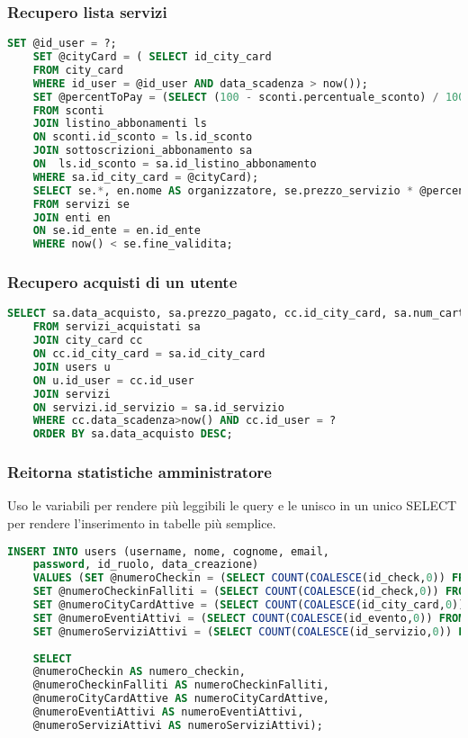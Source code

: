 \subsubsection{Recupero lista servizi}
\begin{lstlisting}[language=SQL]
	SET @id_user = ?;     
	SET @cityCard = ( SELECT id_city_card
	FROM city_card
	WHERE id_user = @id_user AND data_scadenza > now());
	SET @percentToPay = (SELECT (100 - sconti.percentuale_sconto) / 100
	FROM sconti 
	JOIN listino_abbonamenti ls 
	ON sconti.id_sconto = ls.id_sconto
	JOIN sottoscrizioni_abbonamento sa
	ON  ls.id_sconto = sa.id_listino_abbonamento
	WHERE sa.id_city_card = @cityCard);
	SELECT se.*, en.nome AS organizzatore, se.prezzo_servizio * @percentToPay AS prezzo_scontato
	FROM servizi se
	JOIN enti en
	ON se.id_ente = en.id_ente
	WHERE now() < se.fine_validita;
\end{lstlisting}

\subsubsection{Recupero acquisti di un utente}
\begin{lstlisting}[language=SQL]
	SELECT sa.data_acquisto, sa.prezzo_pagato, cc.id_city_card, sa.num_carta_credito, servizi.descrizione_servizio AS nome_servizio, u.id_user, sa.id_servizio
	FROM servizi_acquistati sa
	JOIN city_card cc
	ON cc.id_city_card = sa.id_city_card
	JOIN users u
	ON u.id_user = cc.id_user
	JOIN servizi
	ON servizi.id_servizio = sa.id_servizio
	WHERE cc.data_scadenza>now() AND cc.id_user = ?
	ORDER BY sa.data_acquisto DESC;
\end{lstlisting}



\subsubsection{Reitorna statistiche amministratore}
Uso le variabili per rendere più leggibili le query e le unisco in un unico SELECT per rendere l'inserimento in tabelle più semplice. 
\begin{lstlisting}[language=SQL]
	INSERT INTO users (username, nome, cognome, email,
	password, id_ruolo, data_creazione) 
	VALUES (SET @numeroCheckin = (SELECT COUNT(COALESCE(id_check,0)) FROM checks);
	SET @numeroCheckinFalliti = (SELECT COUNT(COALESCE(id_check,0)) FROM checks WHERE id_check != 1);
	SET @numeroCityCardAttive = (SELECT COUNT(COALESCE(id_city_card,0)) FROM city_card WHERE data_scadenza > now());
	SET @numeroEventiAttivi = (SELECT COUNT(COALESCE(id_evento,0)) FROM eventi WHERE fine_validita > now());
	SET @numeroServiziAttivi = (SELECT COUNT(COALESCE(id_servizio,0)) FROM servizi WHERE fine_validita > now());
	
	SELECT 
	@numeroCheckin AS numero_checkin,
	@numeroCheckinFalliti AS numeroCheckinFalliti,
	@numeroCityCardAttive AS numeroCityCardAttive,
	@numeroEventiAttivi AS numeroEventiAttivi,
	@numeroServiziAttivi AS numeroServiziAttivi);
\end{lstlisting}






